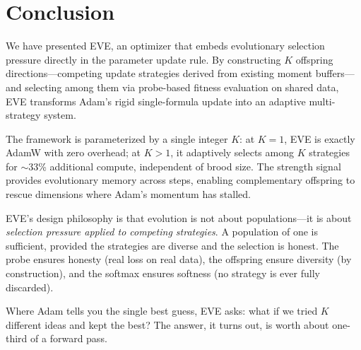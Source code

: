 \documentclass[12pt]{article}
\begin{document}
\section{Conclusion}
\label{sec:conclusion}

We have presented EVE, an optimizer that embeds evolutionary selection
pressure directly in the parameter update rule.
By constructing $K$ offspring directions---competing update strategies
derived from existing moment buffers---and selecting among them via
probe-based fitness evaluation on shared data, EVE transforms Adam's
rigid single-formula update into an adaptive multi-strategy system.

The framework is parameterized by a single integer $K$:
at $K = 1$, EVE is exactly AdamW with zero overhead;
at $K > 1$, it adaptively selects among $K$ strategies for $\sim$33\%
additional compute, independent of brood size.
The strength signal provides evolutionary memory across steps,
enabling complementary offspring to rescue dimensions where Adam's
momentum has stalled.

EVE's design philosophy is that evolution is not about populations---it
is about \emph{selection pressure applied to competing strategies}.
A population of one is sufficient, provided the strategies are diverse
and the selection is honest.
The probe ensures honesty (real loss on real data), the offspring
ensure diversity (by construction), and the softmax ensures softness
(no strategy is ever fully discarded).

Where Adam tells you the single best guess, EVE asks: what if we
tried $K$ different ideas and kept the best?
The answer, it turns out, is worth about one-third of a forward pass.
\end{document}
